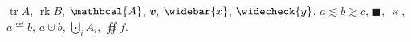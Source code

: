 \documentclass{article}
\DeclareMathOperator{\tr}{tr}
\begin{document}
$\tr A$, $\operatorname{rk} B$, $\mathbcal{A}$, $\mathbfit{v}$, $\widebar{x}$, $\widecheck{y}$, $a\lesssim b\gtrsim c$, $\blacksquare$,
$\varkappa$, $a\eqdef b$, $a\cupdot b$, $\bigcupdot_i A_i$, $\oiint f$.
\end{document}
